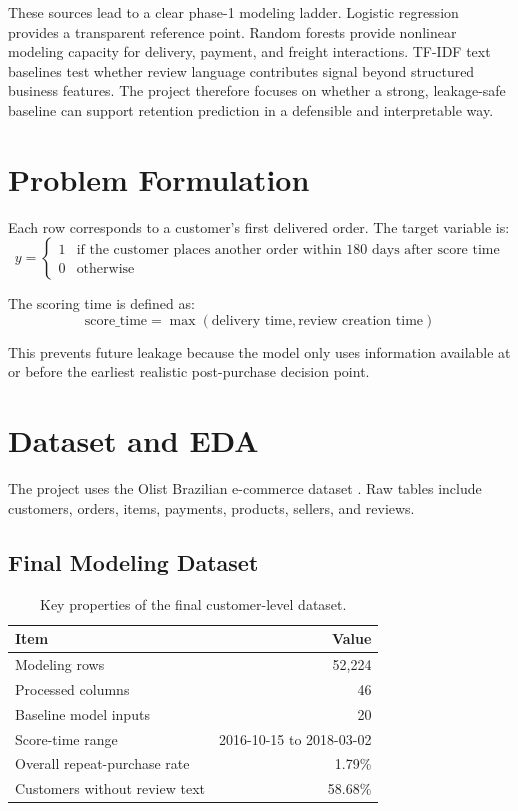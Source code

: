 \documentclass[11pt,a4paper]{article}
\begin{document}
These sources lead to a clear phase-1 modeling ladder. Logistic regression provides a transparent reference point. Random forests provide nonlinear modeling capacity for delivery, payment, and freight interactions. TF-IDF text baselines test whether review language contributes signal beyond structured business features. The project therefore focuses on whether a strong, leakage-safe baseline can support retention prediction in a defensible and interpretable way.

\section{Problem Formulation}
Each row corresponds to a customer's first delivered order. The target variable is:
\[
y =
\begin{cases}
1 & \text{if the customer places another order within 180 days after score time} \\
0 & \text{otherwise}
\end{cases}
\]

The scoring time is defined as:
\[
\text{score\_time} = \max(\text{delivery time}, \text{review creation time})
\]

This prevents future leakage because the model only uses information available at or before the earliest realistic post-purchase decision point.

\section{Dataset and EDA}
The project uses the Olist Brazilian e-commerce dataset \cite{olist}. Raw tables include customers, orders, items, payments, products, sellers, and reviews.

\subsection{Final Modeling Dataset}
\begin{table}[H]
\centering
\begin{tabular}{lr}
\toprule
Item & Value \\
\midrule
Modeling rows & 52{,}224 \\
Processed columns & 46 \\
Baseline model inputs & 20 \\
Score-time range & 2016-10-15 to 2018-03-02 \\
Overall repeat-purchase rate & 1.79\% \\
Customers without review text & 58.68\% \\
\bottomrule
\end{tabular}
\caption{Key properties of the final customer-level dataset.}
\end{table}
\end{document}
